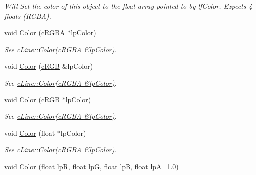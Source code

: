 \begin{DoxyCompactItemize}
\begin{DoxyCompactList}\small\item\em Will Set the color of this object to the float array pointed to by lfColor. Expects 4 floats (RGBA). \end{DoxyCompactList}\item 
\hypertarget{classc_line_a1b7753f4abdae0eab9e3b26082251241}{
void \hyperlink{classc_line_a1b7753f4abdae0eab9e3b26082251241}{Color} (\hyperlink{classc_r_g_b_a}{cRGBA} $\ast$lpColor)}
\label{classc_line_a1b7753f4abdae0eab9e3b26082251241}

\begin{DoxyCompactList}\small\item\em See \hyperlink{classc_line_a06c260e9319257479988f3867ad12d0e}{cLine::Color(cRGBA \&lpColor)}. \end{DoxyCompactList}\item 
\hypertarget{classc_line_a10aa6baf5531433d4944bcaeebaa17e1}{
void \hyperlink{classc_line_a10aa6baf5531433d4944bcaeebaa17e1}{Color} (\hyperlink{classc_r_g_b}{cRGB} \&lpColor)}
\label{classc_line_a10aa6baf5531433d4944bcaeebaa17e1}

\begin{DoxyCompactList}\small\item\em See \hyperlink{classc_line_a06c260e9319257479988f3867ad12d0e}{cLine::Color(cRGBA \&lpColor)}. \end{DoxyCompactList}\item 
\hypertarget{classc_line_a03c832a0976c29bfbfe1c19dd5d3c3a3}{
void \hyperlink{classc_line_a03c832a0976c29bfbfe1c19dd5d3c3a3}{Color} (\hyperlink{classc_r_g_b}{cRGB} $\ast$lpColor)}
\label{classc_line_a03c832a0976c29bfbfe1c19dd5d3c3a3}

\begin{DoxyCompactList}\small\item\em See \hyperlink{classc_line_a06c260e9319257479988f3867ad12d0e}{cLine::Color(cRGBA \&lpColor)}. \end{DoxyCompactList}\item 
\hypertarget{classc_line_a64cbbcfc9b8a08a0c882b5ac9f5c9bfc}{
void \hyperlink{classc_line_a64cbbcfc9b8a08a0c882b5ac9f5c9bfc}{Color} (float $\ast$lpColor)}
\label{classc_line_a64cbbcfc9b8a08a0c882b5ac9f5c9bfc}

\begin{DoxyCompactList}\small\item\em See \hyperlink{classc_line_a06c260e9319257479988f3867ad12d0e}{cLine::Color(cRGBA \&lpColor)}. \end{DoxyCompactList}\item 
\hypertarget{classc_line_a525d28a1f6c2cfe048e7d27a0e483511}{
void \hyperlink{classc_line_a525d28a1f6c2cfe048e7d27a0e483511}{Color} (float lpR, float lpG, float lpB, float lpA=1.0)}
\label{classc_line_a525d28a1f6c2cfe048e7d27a0e483511}


\end{DoxyCompactItemize}
